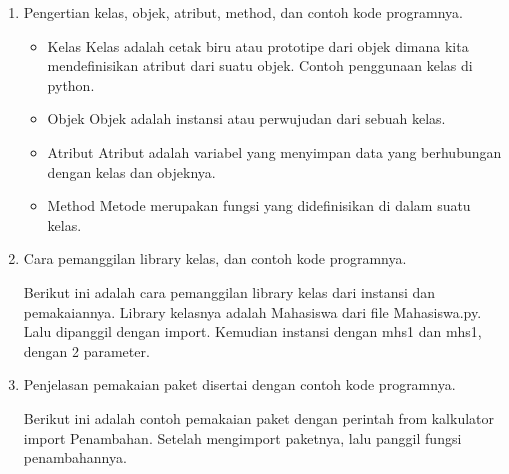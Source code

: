 \begin{enumerate}
	\item Pengertian kelas, objek, atribut, method, dan contoh kode programnya.
	
	\begin{itemize}
		\item Kelas
		Kelas adalah cetak biru atau prototipe dari objek dimana kita mendefinisikan atribut dari suatu objek.
		Contoh penggunaan kelas di python.
		
		
		\item Objek
		Objek adalah instansi atau perwujudan dari sebuah kelas.
		
		
		\item Atribut
		Atribut adalah variabel yang menyimpan data yang berhubungan dengan kelas dan objeknya.
		
		
		\item Method
		Metode merupakan fungsi yang didefinisikan di dalam suatu kelas.
		
		
	\end{itemize}
	
	\item Cara pemanggilan library kelas, dan contoh kode programnya.
	
	Berikut ini adalah cara pemanggilan library kelas dari instansi dan pemakaiannya. Library kelasnya adalah Mahasiswa dari file Mahasiswa.py. Lalu dipanggil dengan import. Kemudian instansi dengan mhs1 dan mhs1, dengan 2 parameter.
	
	
	\item Penjelasan pemakaian paket disertai dengan contoh kode programnya.
	
	Berikut ini adalah contoh pemakaian paket dengan perintah from kalkulator import Penambahan. Setelah mengimport paketnya, lalu panggil fungsi penambahannya.
	
	

\end{enumerate}
